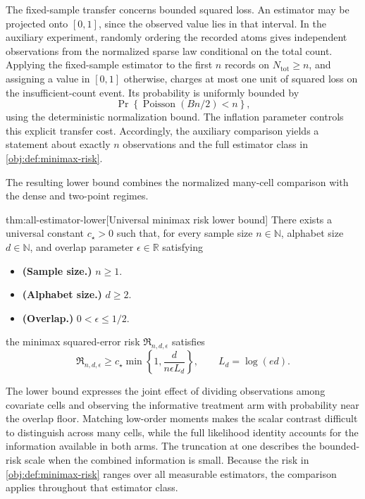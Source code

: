 \documentclass[11pt]{article}
\begin{document}
The fixed-sample transfer concerns bounded squared loss. An estimator may be projected onto \([0,1]\), since the observed value lies in that interval. In the auxiliary experiment, randomly ordering the recorded atoms gives independent observations from the normalized sparse law conditional on the total count. Applying the fixed-sample estimator to the first \(n\) records on \(N_{\mathrm{tot}}\ge n\), and assigning a value in \([0,1]\) otherwise, charges at most one unit of squared loss on the insufficient-count event. Its probability is uniformly bounded by
\[
\Pr\!\left\{\operatorname{Poisson}(Bn/2)<n\right\},
\]
using the deterministic normalization bound. The inflation parameter controls this explicit transfer cost. Accordingly, the auxiliary comparison yields a statement about exactly \(n\) observations and the full estimator class in \cref{obj:def:minimax-risk}.

The resulting lower bound combines the normalized many-cell comparison with the dense and two-point regimes.

\begin{theoremv}{thm:all-estimator-lower}[Universal minimax risk lower bound]
There exists a universal constant \(c_\star>0\) such that, for every sample size \(n\in\mathbb N\), alphabet size \(d\in\mathbb N\), and overlap parameter \(\epsilon\in\mathbb R\) satisfying
\begin{itemize}
\item \textbf{(Sample size.)} \(n\ge1\).
\item \textbf{(Alphabet size.)} \(d\ge2\).
\item \textbf{(Overlap.)} \(0<\epsilon\le1/2\).
\end{itemize}
the minimax squared-error risk \(\mathfrak R_{n,d,\epsilon}\) satisfies
\[
\mathfrak R_{n,d,\epsilon}
\ge c_\star\min\left\{1,\frac{d}{n\epsilon L_d}\right\},
\qquad L_d=\log(ed).
\]
\end{theoremv}

The lower bound expresses the joint effect of dividing observations among covariate cells and observing the informative treatment arm with probability near the overlap floor. Matching low-order moments makes the scalar contrast difficult to distinguish across many cells, while the full likelihood identity accounts for the information available in both arms. The truncation at one describes the bounded-risk scale when the combined information is small. Because the risk in \cref{obj:def:minimax-risk} ranges over all measurable estimators, the comparison applies throughout that estimator class.
\end{document}
